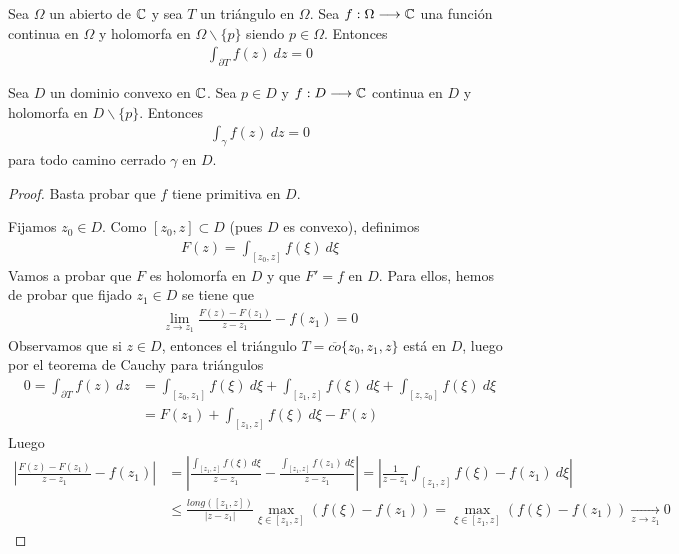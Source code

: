 \begin{teo}
    Sea $\Omega$ un abierto de $\mathbb{C}$ y sea $T$ un triángulo en $\Omega$. Sea $f: \Omega \longrightarrow \mathbb{C}$ una función continua en $\Omega$ y holomorfa en $\Omega \backslash \{p\}$ siendo $p \in \Omega$. Entonces
    \begin{align*}
        \int_{\partial T}{f(z) \ dz} = 0
    \end{align*}
\end{teo}

\begin{teo}
    Sea $D$ un dominio convexo en $\mathbb{C}$. Sea $p \in D$ y $f: D \longrightarrow \mathbb{C}$ continua en $D$ y holomorfa en $D \backslash \{p\}$. Entonces
    \begin{align*}
        \int_{\gamma}{f(z) \ dz} = 0
    \end{align*}
    para todo camino cerrado $\gamma$ en $D$.
\end{teo}

\begin{proof}
    Basta probar que $f$ tiene primitiva en $D$.

    Fijamos $z_0 \in D$. Como $[z_0,z] \subset D$ (pues $D$ es convexo), definimos
    \begin{align*}
        F(z) = \int_{[z_0,z]}{f(\xi) \ d\xi}
    \end{align*}
    Vamos a probar que $F$ es holomorfa en $D$ y que $F' = f$ en $D$. Para ellos, hemos de probar que fijado $z_1 \in D$ se tiene que
    \begin{align*}
        \lim_{z \to z_1} \frac{F(z) - F(z_1)}{z - z_1} - f(z_1) = 0
    \end{align*}
    Observamos que si $z \in D$, entonces el triángulo $T = \overline{co}\{z_0,z_1,z\}$ está en $D$, luego por el teorema de Cauchy para triángulos
    \begin{align*}
        0 = \int_{\partial T}{f(z) \ dz} & = \int_{[z_0,z_1]}{f(\xi) \ d\xi} + \int_{[z_1,z]}{f(\xi) \ d\xi} + \int_{[z,z_0]}{f(\xi) \ d\xi} \\
                                         & = F(z_1) + \int_{[z_1,z]}{f(\xi) \ d\xi}- F(z)
    \end{align*}
    Luego
    \begin{align*}
        \left| \frac{F(z) - F(z_1)}{z - z_1} - f(z_1) \right| & = \left| \frac{\int_{[z_1,z]}{f(\xi) \ d\xi}}{z-z_1} - \frac{\int_{[z_1,z]}{f(z_1) \ d\xi}}{z-z_1} \right| = \left| \frac{1}{z-z_1}\int_{[z_1,z]}{f(\xi) - f(z_1) \ d\xi}\right| \\
                                                              & \leq \frac{long([z_1,z])}{|z-z_1|} \max_{\xi \in [z_1,z]}(f(\xi) - f(z_1)) = \max_{\xi \in [z_1,z]}(f(\xi) - f(z_1)) \xrightarrow[z \to z_1]{} 0
    \end{align*}
\end{proof}

